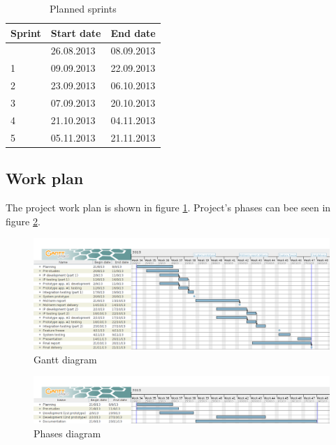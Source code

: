 \begin{table}[h]
\begin{center}
\begin{tabular}{ | l | l | l | }
  \hline
  Sprint & Start date & End date \\
  \hline\noalign{\smallskip}\hline
  0 & 26.08.2013 & 08.09.2013 \\ 
  1 & 09.09.2013 & 22.09.2013 \\
  2 & 23.09.2013 & 06.10.2013 \\
  3 & 07.09.2013 & 20.10.2013 \\
  4 & 21.10.2013 & 04.11.2013 \\
  5 & 05.11.2013 & 21.11.2013 \\
  \hline
\end{tabular}
\end{center}
\caption{Planned sprints}
\label{table:sprints}
\end{table}


\subsection{Work plan}
\label{section:workplan}

The project work plan is shown in figure \ref{figure:work-plan}.
Project's phases can bee seen in figure \ref{figure:phase-plan}.

\newpage

\begin{landscape}
\begin{figure}
\includegraphics[scale=0.5]{../Figures/gantt-diagram.png}
\caption{Gantt diagram}
\label{figure:work-plan}
\end{figure}

\begin{figure}
\includegraphics[scale=0.5]{../Figures/phases-diagram.png}
\caption{Phases diagram}
\label{figure:phase-plan}
\end{figure}

\end{landscape}

